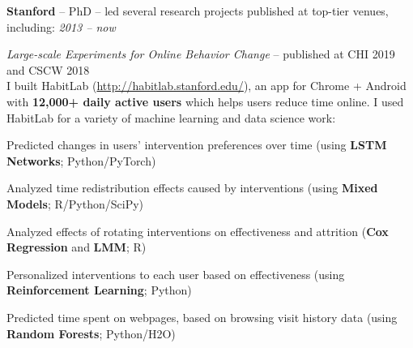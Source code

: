 \documentclass[margin,line]{resume}
\begin{document}
\begin{resume}
\textbf{Stanford} -- PhD -- led several research projects published at top-tier venues, including: \hfill \textsl{2013 -- now}\\




\vspace{-7mm}

\textit{Large-scale Experiments for Online Behavior Change} -- published at CHI 2019 and CSCW 2018\\
I built HabitLab (\url{http://habitlab.stanford.edu/}), an app for Chrome + Android with \textbf{12,000+ daily active users} which helps users reduce time online. I used HabitLab for a variety of machine learning and data science work:\\

\vspace{-4mm}

%
\begin{compactitem}
\item Predicted changes in users' intervention preferences over time (using \textbf{LSTM Networks}; Python/PyTorch)
\item Analyzed time redistribution effects caused by interventions (using \textbf{Mixed Models}; R/Python/SciPy)
\item Analyzed effects of rotating interventions on effectiveness and attrition (\textbf{Cox Regression} and \textbf{LMM}; R)
\item Personalized interventions to each user based on effectiveness (using \textbf{Reinforcement Learning}; Python)
\item Predicted time spent on webpages, based on browsing visit history data (using \textbf{Random Forests}; Python/H2O)
\end{compactitem}

\vspace{-2mm}



\end{resume}
\end{document}
